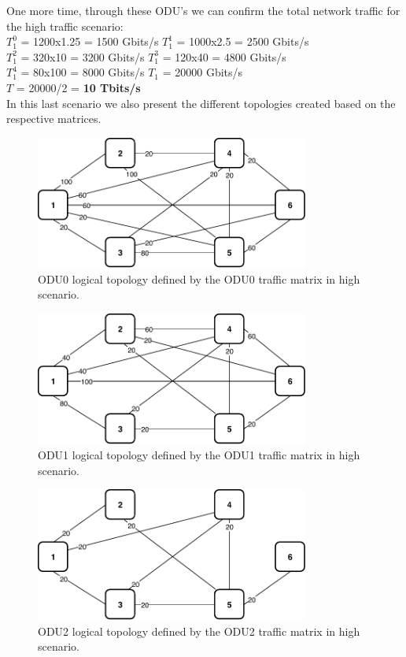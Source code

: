One more time, through these ODU's we can confirm the total network traffic for the high traffic scenario:\\

$T_1^0$ = 1200x1.25 = 1500 Gbits/s \qquad
$T_1^1$ = 1000x2.5 = 2500 Gbits/s \\

$T_1^2$ = 320x10 = 3200 Gbits/s \qquad
$T_1^3$ = 120x40 = 4800 Gbits/s \\

$T_1^4$ = 80x100 = 8000 Gbits/s \qquad
$T_{1}$ = 20000 Gbits/s \\

$T$ = 20000/2 = \textbf{10 Tbits/s}\\

In this last scenario we also present the different topologies created based on the respective matrices.

\begin{figure}[h!]
\centering
\includegraphics[width=9cm]{sdf/ilp/opaque_survivability/figures/logical_topology_ODU0_high}
\caption{ODU0 logical topology defined by the ODU0 traffic matrix in high scenario.}
\label{logical_ODU0_high}
\end{figure}

\begin{figure}[h!]
\centering
\includegraphics[width=9cm]{sdf/ilp/opaque_survivability/figures/logical_topology_ODU1_high}
\caption{ODU1 logical topology defined by the ODU1 traffic matrix in high scenario.}
\label{logical_ODU1_high}
\end{figure}

\begin{figure}[h!]
\centering
\includegraphics[width=9cm]{sdf/ilp/opaque_survivability/figures/logical_topology_ODU2_high}
\caption{ODU2 logical topology defined by the ODU2 traffic matrix in high scenario.}
\label{logical_ODU2_high}
\end{figure}

